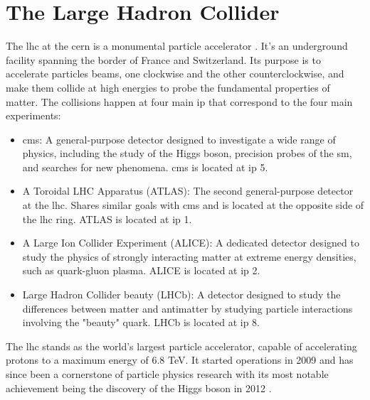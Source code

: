 \section{The Large Hadron Collider}
\label{subsec:lhc}


The \acrfull{lhc} at the \acrfull{cern} is a monumental particle accelerator \cite{lhc}. It's an underground facility spanning the border of France and Switzerland. Its purpose is to accelerate particles beams, one clockwise and the other counterclockwise, and make them collide at high energies to probe the fundamental properties of matter. The collisions happen at four main \acrfull{ip} that correspond to the four main experiments:
\begin{itemize}
	\item \acrfull{cms}: A general-purpose detector designed to investigate a wide range of physics, including the study of the Higgs boson, precision probes of the \acrshort{sm}, and searches for new phenomena. \acrshort{cms} is located at \acrshort{ip} 5.
	\item A Toroidal LHC Apparatus (ATLAS): The second general-purpose detector at the \acrshort{lhc}. Shares similar goals with \acrshort{cms} and is located at the opposite side of the \acrshort{lhc} ring. ATLAS is located at \acrshort{ip} 1.
	\item A Large Ion Collider Experiment (ALICE): A dedicated detector designed to study the physics of strongly interacting matter at extreme energy densities, such as quark-gluon plasma. ALICE is located at \acrshort{ip} 2.
	\item Large Hadron Collider beauty (LHCb): A detector designed to study the differences between matter and antimatter by studying particle interactions involving the "beauty" quark. LHCb is located at \acrshort{ip} 8.
\end{itemize}

The \acrshort{lhc} stands as the world's largest particle accelerator, capable of accelerating protons to a maximum energy of 6.8 TeV. It started operations in 2009 and has since been a cornerstone of particle physics research with its most notable achievement being the discovery of the Higgs boson in 2012 \cite{HiggsDiscovery}.


